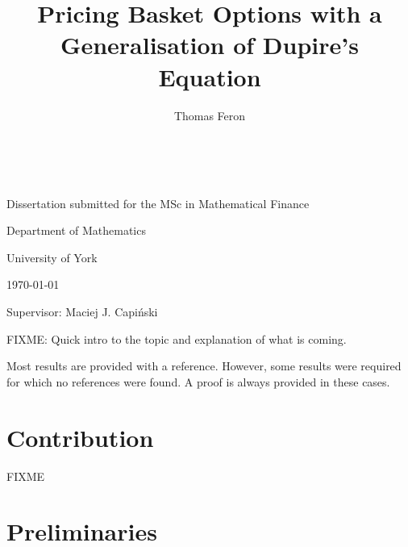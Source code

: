 \documentclass[english]{article}
\numberwithin{equation}{section}
\numberwithin{figure}{section}
\theoremstyle{bolddescit}
\theoremstyle{definition}
\theoremstyle{definition}
\theoremstyle{plain}
\theoremstyle{plain}
\theoremstyle{bolddesc}
\theoremstyle{plain}
\theoremstyle{remark}
\begin{document}
\title{Pricing Basket Options with a Generalisation of Dupire's Equation}
\author{Thomas Feron}
\date{~}

\maketitle
\vspace{2.5in}

\noindent \begin{center}
Dissertation submitted for the MSc in Mathematical Finance
\par\end{center}

\begin{center}
\bigskip{}
\par\end{center}

\begin{center}
Department of Mathematics

University of York\bigskip{}
\par\end{center}

\begin{center}
\today
\par\end{center}

\vspace{1in}

\begin{center}
Supervisor: Maciej J. Capi\'nski
\par\end{center}

\newpage{}

\tableofcontents{}\newpage{}

\pagebreak

FIXME: Quick intro to the topic and explanation of what is coming.

Most results are provided with a reference. However, some results were required for which no references were found. A proof is always provided in these cases.

\section{Contribution}

FIXME

\section{Preliminaries}
\end{document}
